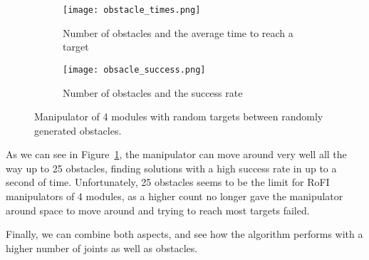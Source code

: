 \begin{figure}
  \centering
  \begin{subfigure}{.45\textwidth}
    \texttt{[image: obstacle\_times.png]}
    \caption{Number of obstacles and the average time to reach a target}
  \end{subfigure}
  \begin{subfigure}{0.45\textwidth}
    \texttt{[image: obsacle\_success.png]}
    \caption{Number of obstacles and the success rate}
  \end{subfigure}

  \caption{Manipulator of 4 modules with random targets between randomly generated obstacles.}\label{fig:inc_obst}
\end{figure}

As we can see in Figure~\ref{fig:inc_obst}, the manipulator can move around very well all the way up to 25 obstacles, finding solutions with a high success rate in up to a second of time. Unfortunately, 25 obstacles seems to be the limit for RoFI manipulators of 4 modules, as a higher count no longer gave the manipulator around space to move around and trying to reach most targets failed.

Finally, we can combine both aspects, and see how the algorithm performs with a higher number of joints as well as obstacles.
